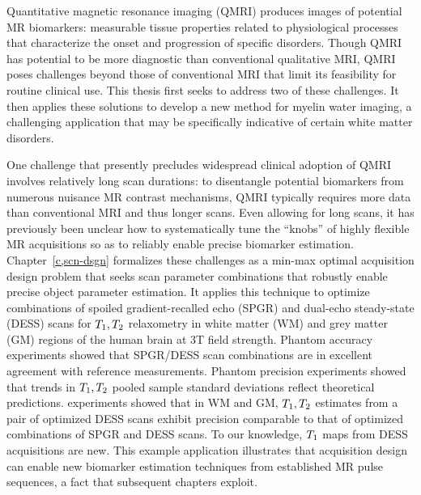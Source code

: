 \setlength{\parindent}{0ex}
Quantitative magnetic resonance imaging (QMRI)
produces images of potential MR biomarkers: 
measurable tissue properties
related to physiological processes
that characterize the onset and progression
of specific disorders.
Though QMRI has potential 
to be more diagnostic
than conventional qualitative MRI,
QMRI poses challenges 
beyond those of conventional MRI
that limit its feasibility 
for routine clinical use.
This thesis first seeks to address 
two of these challenges.
It then applies these solutions
to develop a new method
for myelin water imaging,
a challenging application 
that may be specifically indicative
of certain white matter disorders. 

\setlength{\parindent}{4ex}
One challenge 
that presently precludes widespread clinical adoption of QMRI
involves relatively long scan durations:
to disentangle potential biomarkers
from numerous nuisance MR contrast mechanisms,
QMRI typically requires more data than conventional MRI
and thus longer scans. 
Even allowing for long scans,
it has previously been unclear 
how to systematically tune the ``knobs'' 
of highly flexible MR acquisitions
so as to reliably enable precise biomarker estimation.
Chapter~\ref{c,scn-dsgn} formalizes these challenges
as a min-max optimal acquisition design problem
that seeks scan parameter combinations
that robustly enable precise object parameter estimation.
It applies this technique
to optimize combinations
of spoiled gradient-recalled echo (SPGR) 
and dual-echo steady-state (DESS) scans
for $T_1,T_2$ relaxometry
in white matter (WM) and grey matter (GM) regions
of the human brain at 3T field strength.
Phantom accuracy experiments showed
that SPGR/DESS scan combinations
are in excellent agreement 
with reference measurements.
Phantom precision experiments showed
that trends in $T_1,T_2$ pooled sample standard deviations
reflect theoretical predictions.
\Invivo experiments showed
that in WM and GM,
$T_1,T_2$ estimates
from a pair of optimized DESS scans
exhibit precision comparable 
to that of optimized combinations 
of SPGR and DESS scans.
To our knowledge,
$T_1$ maps from DESS acquisitions are new.
This example application illustrates
that acquisition design can enable 
new biomarker estimation techniques
from established MR pulse sequences,
a fact that subsequent chapters exploit.

